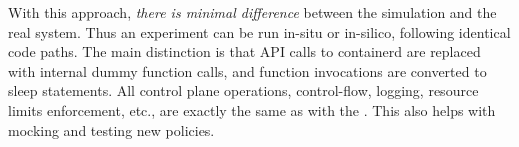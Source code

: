 With this approach, \emph{there is minimal difference} between the simulation and the real system. 
Thus an experiment can be run in-situ or in-silico, following identical code paths.
The main distinction is that API calls to containerd are replaced with internal dummy function calls, and function invocations are converted to sleep statements.  
All control plane operations, control-flow, logging, resource limits enforcement, etc., are exactly the same as with the  \sysname.
This also helps with mocking and testing new policies. 



